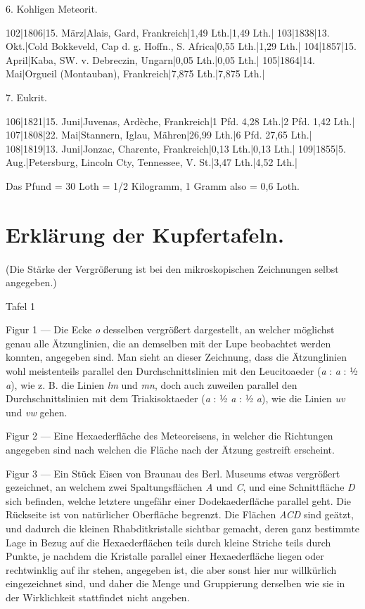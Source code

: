 \documentclass[a4paper, 11pt, oneside]{article}
\begin{document}
6. Kohligen Meteorit.  

102|1806|15. März|Alais, Gard, Frankreich|1,49 Lth.|1,49 Lth.|  
103|1838|13. Okt.|Cold Bokkeveld, Cap d. g. Hoffn., S. Africa|0,55 Lth.|1,29 Lth.|  
104|1857|15. April|Kaba, SW. v. Debreczin, Ungarn|0,05 Lth.|0,05 Lth.|  
105|1864|14. Mai|Orgueil (Montauban), Frankreich|7,875 Lth.|7,875 Lth.|  

7. Eukrit.  

106|1821|15. Juni|Juvenas, Ardèche, Frankreich|1 Pfd. 4,28 Lth.|2 Pfd. 1,42 Lth.|  
107|1808|22. Mai|Stannern, Iglau, Mähren|26,99 Lth.|6 Pfd. 27,65 Lth.|  
108|1819|13. Juni|Jonzac, Charente, Frankreich|0,13 Lth.|0,13 Lth.|  
109|1855|5. Aug.|Petersburg, Lincoln Cty, Tennessee, V. St.|3,47 Lth.|4,52 Lth.|  
  
Das Pfund = 30 Loth = 1/2 Kilogramm, 1 Gramm also = 0,6 Loth.
\clearpage
\section{Erklärung der Kupfertafeln.}
\paragraph{}
(Die Stärke der Vergrößerung ist bei den mikroskopischen Zeichnungen selbst angegeben.)

Tafel 1

Figur 1 --- Die Ecke \emph{o} desselben vergrößert dargestellt, an welcher möglichst genau alle Ätzunglinien, die an demselben mit der Lupe beobachtet werden konnten, angegeben sind. Man sieht an dieser Zeichnung, dass die Ätzunglinien wohl meistenteils parallel den Durchschnittslinien mit den Leucitoaeder (\emph{a} : \emph{a} : ½ \emph{a}), wie z. B. die Linien \emph{lm} und \emph{mn}, doch auch zuweilen parallel den Durchschnittslinien mit dem Triakisoktaeder (\emph{a} : ½ \emph{a} : ½ \emph{a}), wie die Linien \emph{uv} und \emph{vw} gehen.

Figur 2 --- Eine Hexaederfläche des Meteoreisens, in welcher die Richtungen angegeben sind nach welchen die Fläche nach der Ätzung gestreift erscheint.

Figur 3 --- Ein Stück Eisen von Braunau des Berl. Museums etwas vergrößert gezeichnet, an welchem zwei Spaltungsflächen \emph{A} und \emph{C}, und eine Schnittfläche \emph{D} sich befinden, welche letztere ungefähr einer Dodekaederfläche parallel geht. Die Rückseite ist von natürlicher Oberfläche begrenzt. Die Flächen \emph{ACD} sind geätzt, und dadurch die kleinen Rhabditkristalle sichtbar gemacht, deren ganz bestimmte Lage in Bezug auf die Hexaederflächen teils durch kleine Striche teils durch Punkte, je nachdem die Kristalle parallel einer Hexaederfläche liegen oder rechtwinklig auf ihr stehen, angegeben ist, die aber sonst hier nur willkürlich eingezeichnet sind, und daher die Menge und Gruppierung derselben wie sie in der Wirklichkeit stattfindet nicht angeben.
\end{document}
